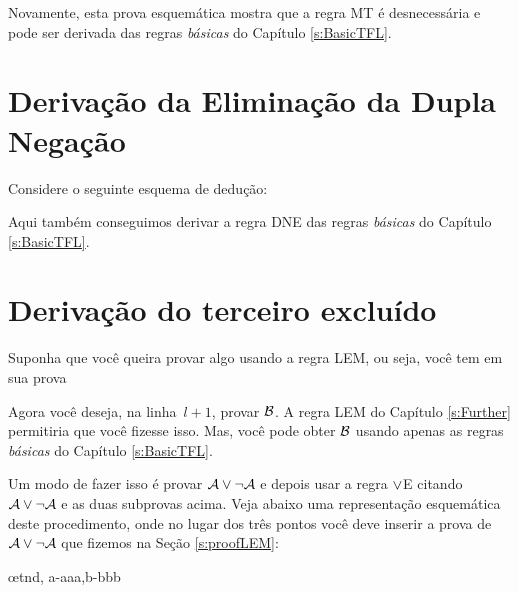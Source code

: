 \begin{fitchproof}
		\open
		\close
\end{fitchproof}
Novamente, esta prova esquemática mostra que a regra MT é desnecessária e pode ser derivada das regras  \emph{básicas} do Capítulo \ref{s:BasicTFL}.


\section{Derivação da Eliminação da Dupla Negação}
Considere o seguinte esquema de dedução:
	\begin{fitchproof}
	\open
	\close
\end{fitchproof}
Aqui também conseguimos derivar a regra DNE das regras \emph{básicas} do Capítulo \ref{s:BasicTFL}.

\section{Derivação do terceiro excluído}
Suponha que você queira provar algo usando a regra LEM, ou seja, você tem em sua prova
 
\begin{fitchproof}
  \open
  \close
  \open
  \close
\end{fitchproof}
Agora você deseja, na linha~$l+1$, provar $\mathcal{B}$. A regra LEM do Capítulo \ref{s:Further} permitiria que você fizesse isso. Mas, você pode obter $\mathcal{B}$ usando apenas as regras  \emph{básicas} do Capítulo \ref{s:BasicTFL}.

Um modo de fazer isso é provar $\mathcal{A} \vee \neg\mathcal{A}$ e depois usar a regra $\vee$E citando $\mathcal{A} \vee \neg\mathcal{A}$ e as duas subprovas acima. Veja abaixo uma representação esquemática deste procedimento, onde no lugar dos três pontos você deve inserir a prova de $\mathcal{A} \vee \neg\mathcal{A}$ que fizemos na Seção \ref{s:proofLEM}:

\begin{fitchproof}
  \open
  \close
  \open
  \close
  \ellipsesline
  \oe{tnd, a-aaa,b-bbb}
\end{fitchproof}


